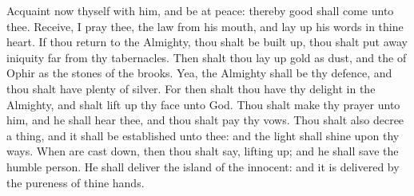 {\par }{\PP {}Acquaint now thyself with him, and be at
peace: thereby
good shall
come unto thee.
Receive, I pray thee, the
law from his
mouth, and lay
up his
words in thine
heart.
If thou
return to the
Almighty, thou shalt be built
up, thou shalt put
away
iniquity
far from thy
tabernacles.
Then shalt thou lay
up
gold
as
dust, and the
{} of
Ophir as the
stones of the
brooks.
Yea, the
Almighty shall be thy
defence, and thou shalt have
plenty of
silver.
For then shalt thou have thy
delight in the
Almighty, and shalt lift
up thy
face unto
God.
Thou shalt make thy
prayer unto him, and he shall
hear thee, and thou shalt
pay thy
vows.
Thou shalt also
decree a
thing, and it shall be
established unto thee: and the
light shall
shine upon thy
ways.
When
{} are cast
down, then thou shalt
say,
{} lifting
up; and he shall
save the
humble
person.
He shall
deliver the
island of the
innocent: and it is
delivered by the
pureness of thine
hands.

}
